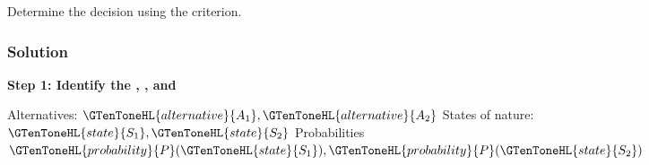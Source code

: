 	Determine the decision using the    criterion.
	
	
	\subsubsection{Solution}
	
	\textbf{Step 1: Identify the ,   , and }
	
	Alternatives: $\GTenToneHL{alternative}{A_1}, \GTenToneHL{alternative}{A_2}$ \qquad
	States of nature: $\GTenToneHL{state}{S_1}, \GTenToneHL{state}{S_2}$ \qquad
	Probabilities
	$
	\GTenToneHL{probability}{P}(\GTenToneHL{state}{S_1}),
	\GTenToneHL{probability}{P}(\GTenToneHL{state}{S_2})
	$
	
	\noindent
	\setlength{\columnseprule}{0.4pt}
	

